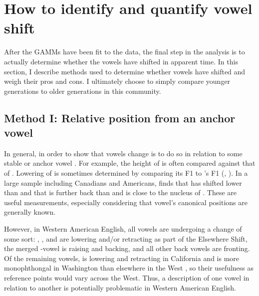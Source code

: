 




\section{How to identify and quantify vowel shift}
\label{how_shifting_is_measured}

After the GAMMs have been fit to the data, the final step in the analysis is to actually determine whether the vowels have shifted in apparent time. In this section, I describe methods used to determine whether vowels have shifted and weigh their pros and cons. I ultimately choose to simply compare younger generations to older generations in this community.

\subsection{Method I: Relative position from an anchor vowel}

In general, in order to show that vowels change is to do so in relation to some stable or anchor vowel \citep[103--104]{dipaolo_etal_2011}. For example, the height of \trap is often compared against that of \lot \citep[20]{thomas_2001}. Lowering of \bit is sometimes determined by comparing its F1 to \face's F1 (\citealt[44]{kennedy_grama_2012}, \citealt[97]{bowie_2017_pads}). In a large sample including Canadians and Americans, \citet{boberg_2019} finds that \kit has shifted lower than \face and that \trap is further back than \goose and is close to the nucleus of \mouth. These are useful measurements, especially considering that vowel’s canonical positions are generally known.

However, in Western American English, all vowels are undergoing a change of some sort: \kit, \dress, and \trap are lowering and/or retracting as part of the Elsewhere Shift, the merged \lot-\thought vowel is raising and backing, and all other back vowels are fronting. Of the remaining vowels, \fleece is lowering and retracting in California \citep{donofrio_etal_2019} and \face is more monophthongal in Washington than elsewhere in the West \citep{wassink_2015}, so their usefulness as reference points would vary across the West. Thus, a description of one vowel in relation to another is potentially problematic in Western American English.

